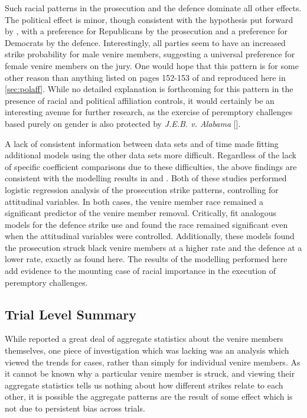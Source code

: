 Such racial patterns in the prosecution and the defence dominate all other effects. The political effect is minor, though
consistent with the hypothesis put forward by \cite{revesz2016}, with a preference for Republicans by the prosecution and a
preference for Democrats by the defence. Interestingly, all parties
seem to have an increased strike probability for male venire
members, suggesting a universal preference for female venire members on the jury. One would hope that this pattern is for some
other reason than anything listed on pages 152-153 of \cite{vandykejurysel} and reproduced here in \ref{sec:polaff}. While no
detailed explanation is forthcoming for this pattern in the presence of racial and political affiliation controls, it would
certainly be an interesting avenue for further research, as the exercise of peremptory challenges based purely on gender is also
protected by \textit{J.E.B. v. Alabama} [\cite{jebvalabama}].

A lack of consistent information between data sets and of time made fitting additional models using the other data sets more
difficult. Regardless of the lack of specific coefficient comparisons due to these difficulties, the above findings are consistent
with the modelling results in \cite{StubbornLegacy} and \cite{PerempChalMurder}. Both of these studies performed logistic
regression analysis of the prosecution strike patterns, controlling for attitudinal variables. In both cases, the venire member
race remained a significant predictor of the venire member removal. Critically, \citeauthor{PerempChalMurder} fit analogous
models for the defence strike use and found the race remained significant even when the attitudinal variables were
controlled. Additionally, these models found the prosecution struck black venire members at a higher rate and the defence at a
lower rate, exactly as found here. The results of the modelling performed here add evidence to the mounting case of racial
importance in the execution of peremptory challenges.
                
\subsection{Trial Level Summary} \label{sec:casesum}

While \cite{JurySunshineProj} reported a great deal of aggregate statistics about the venire members themselves, one piece of
investigation which was lacking was an analysis which viewed the trends for cases, rather than simply for
individual venire members. As it cannot be known why a particular venire member is struck, and viewing their aggregate
statistics tells us nothing about how different strikes relate to each other, it is possible the aggregate patterns are the result
of some effect which is not due to persistent bias across trials.

